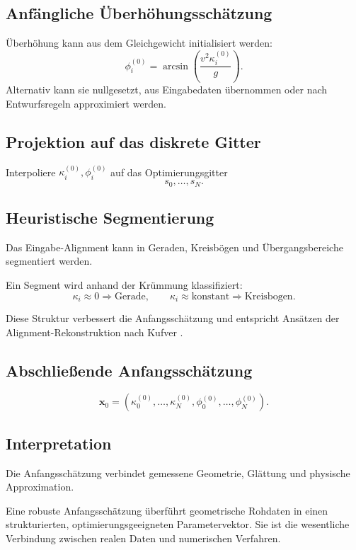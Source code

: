 \subsection{Anfängliche Überhöhungsschätzung}
Überhöhung kann aus dem Gleichgewicht initialisiert werden:
\[
\phi_i^{(0)}=\arcsin\left(\frac{v^2\kappa_i^{(0)}}{g}\right).
\]
Alternativ kann sie nullgesetzt, aus Eingabedaten übernommen oder nach
Entwurfsregeln approximiert werden.

\subsection{Projektion auf das diskrete Gitter}
\begin{definition}
Interpoliere \(\kappa_i^{(0)},\phi_i^{(0)}\) auf das Optimierungsgitter
\[
s_0,\dots,s_N.
\]
\end{definition}

\subsection{Heuristische Segmentierung}
Das Eingabe-Alignment kann in Geraden, Kreisbögen und Übergangsbereiche
segmentiert werden.
\begin{definition}[Segmenterkennung]
Ein Segment wird anhand der Krümmung klassifiziert:
\[
\kappa_i\approx0\Rightarrow\text{Gerade},
\qquad
\kappa_i\approx\text{konstant}\Rightarrow\text{Kreisbogen}.
\]
\end{definition}
Diese Struktur verbessert die Anfangsschätzung und entspricht Ansätzen der
Alignment-Rekonstruktion nach Kufver
\cite{Kufver1997MathematicalDescription,Kufver2000RailwayAlignment}.

\subsection{Abschließende Anfangsschätzung}
\begin{definition}
\[
\mathbf x_0=(\kappa_0^{(0)},\dots,\kappa_N^{(0)},
\phi_0^{(0)},\dots,\phi_N^{(0)}).
\]
\end{definition}

\subsection{Interpretation}
Die Anfangsschätzung verbindet gemessene Geometrie, Glättung und physische
Approximation.
\begin{summary}
Eine robuste Anfangsschätzung überführt geometrische Rohdaten in einen
strukturierten, optimierungsgeeigneten Parametervektor. Sie ist die wesentliche
Verbindung zwischen realen Daten und numerischen Verfahren.
\end{summary}
